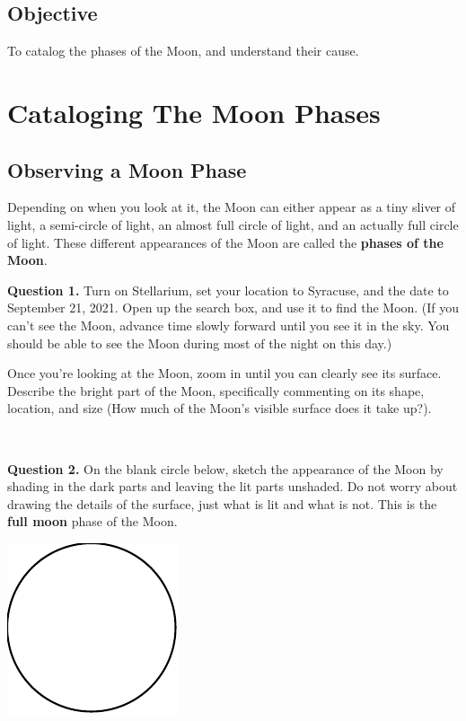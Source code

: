 \documentclass[11pt]{article}
\begin{document}
\subsection*{Objective}

To catalog the phases of the Moon, and understand their cause.

\newpage

\section{Cataloging The Moon Phases}

\subsection{Observing a Moon Phase}

Depending on when you look at it, the Moon can either appear as a tiny sliver of light, a semi-circle of light, an almost full circle of light, and an actually full circle of light. These different appearances of the Moon are called the \textbf{phases of the Moon}.

\noindent
\textbf{Question 1.} Turn on Stellarium, set your location to Syracuse, and the date to September 21, 2021. Open up the search box, and use it to find the Moon. (If you can't see the Moon, advance time slowly forward until you see it in the sky. You should be able to see the Moon during most of the night on this day.)

Once you're looking at the Moon, zoom in until you can clearly see its surface.\\

Describe the bright part of the Moon, specifically commenting on its shape, location, and size (How much of the Moon's visible surface does it take up?).\\
\vspace*{1.5cm}

\hrulefill\\
\noindent

\textbf{Question 2.} On the blank circle below, sketch the appearance of the Moon by shading in the dark parts and leaving the lit parts unshaded. Do not worry about drawing the details of the surface, just what is lit and what is not. This is the \textbf{full moon} phase of the Moon.\\
\begin{center}
	\includegraphics{blank_moon}
\end{center}
\end{document}
